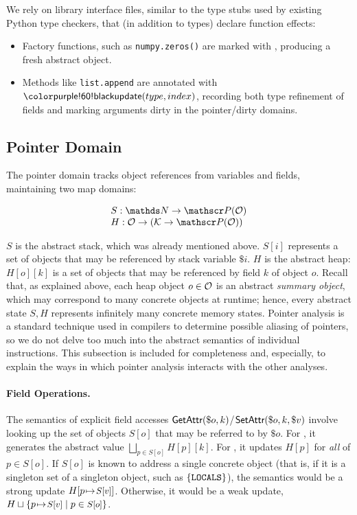 We rely on library interface files, similar to the type stubs used by existing Python type checkers, that (in addition to types) declare function effects:

\begin{itemize}
  \item Factory functions, such as \texttt{numpy.zeros()} are marked with \tnew, producing a fresh abstract object.
  \item Methods like \texttt{list.append} are annotated with $\tupdate(type, index)$, recording both type refinement of fields and marking arguments dirty in the pointer/dirty domains.
\end{itemize}

\subsection{Pointer Domain}
\label{sec:pointer}

The pointer domain tracks object references from variables
and fields, maintaining two map domains:

\[
\begin{array}{@{}l@{}}
  S : \tN \to \powerset(\tO) \\
  H : \tO \to (\tK \to \powerset(\tO))
\end{array}
\]

$S$ is the abstract stack, which was already mentioned above.
$S[i]$ represents a set of objects that may be referenced
by stack variable $\$i$.
$H$ is the abstract heap: $H[o][k]$ is a set of objects that
may be referenced by field $k$ of object $o$.
Recall that, as explained above, each heap object $o\in\mathcal{O}$
is an abstract \emph{summary object}, which may correspond
to many concrete objects at runtime;
hence, every abstract state $S,H$ represents infinitely
many concrete memory states.
Pointer analysis is a standard technique used in compilers
to determine possible aliasing of pointers, so we do not
delve too much into the abstract semantics of individual
instructions.
This subsection is included for completeness and, especially,
to explain the ways in which pointer analysis interacts with
the other analyses.


\paragraph{Field Operations.}
The semantics of explicit field accesses 
$\textsf{GetAttr}(\$o, k)$/$\textsf{SetAttr}(\$o, k, \$v)$
involve looking up the set of objects $S[o]$ that may be
referred to by $\$o$.
For \tGetAttr, it generates the abstract value
$\bigsqcup_{p \in S[o]} H[p][k]$.
For \tSetAttr, it updates $H[p]$ for \emph{all} of $p\in S[o]$.
If $S[o]$ is known to address a single concrete object (that is, if it is a singleton set of a singleton object, such as
$\{\texttt{LOCALS}\}$),
the semantics would be a strong update
$H[p{\hspace{1pt}\mapsto\hspace{1pt}} \mbox{\small $S[v]$}]$.
Otherwise, it would be a weak update,
$H\sqcup\{p{\hspace{1pt}\mapsto\hspace{1pt}} \mbox{\small $S[v]$}\mid p\in \mbox{\small $S[o]$}\}$.

